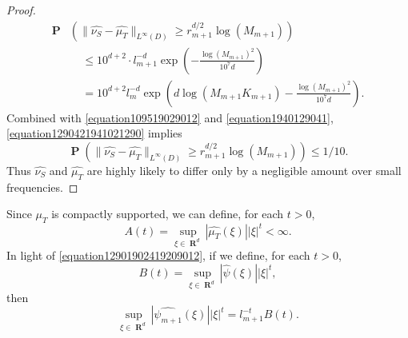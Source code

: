 \documentclass[12pt,reqno]{article}
\numberwithin{equation}{section}
\DeclareMathOperator{\RR}{\mathbf{R}}
\DeclareMathOperator{\PP}{\mathbf{P}}
\begin{document}
\begin{proof}
\begin{equation}
    \begin{split}
        \PP& \left(\| \widehat{\nu_S} - \widehat{\mu_T} \|_{L^\infty(D)} \geq r_{m+1}^{d/2} \log(M_{m+1}) \right)\\
        &\ \ \ \ \ \leq 10^{d+2} \cdot l_{m+1}^{-d} \exp \left( - \frac{\log(M_{m+1})^2}{10^7 d} \right)\\
        &\ \ \ \ \ = 10^{d+2} l_m^{-d} \exp \left( d \log(M_{m+1} K_{m+1}) - \frac{\log(M_{m+1})^2}{10^7 d} \right).
    \end{split}
    \end{equation}
    Combined with \eqref{equation109519029012} and \eqref{equation1940129041}, \eqref{equation1290421941021290} implies
    \begin{equation} \label{equation0148912489128}
        \PP \left(\| \widehat{\nu_S} - \widehat{\mu_T} \|_{L^\infty(D)} \geq r_{m+1}^{d/2} \log(M_{m+1}) \right) \leq 1/10.
    \end{equation}
    Thus $\widehat{\nu_S}$ and $\widehat{\mu_T}$ are highly likely to differ only by a negligible amount over small frequencies.
\end{proof}

Since $\mu_T$ is compactly supported, we can define, for each $t > 0$,
%
\[ A(t) = \sup_{\xi \in \RR^d} |\widehat{\mu_T}(\xi)| |\xi|^t < \infty. \]
%
In light of \eqref{equation12901902419209012}, if we define, for each $t > 0$,
%
\[ B(t) = \sup_{\xi \in \RR^d} |\widehat{\psi}(\xi)| |\xi|^t, \]
%
then
%
\[ \sup_{\xi \in \RR^d} |\widehat{\psi_{m+1}}(\xi)| |\xi|^t = l_{m+1}^{-t} B(t). \]
\end{document}
